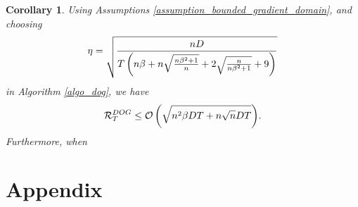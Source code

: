 \documentclass{article}
\newtheorem{Corollary}{\bf{Corollary}}
\begin{document}
\begin{Corollary}
Using Assumptions \ref{assumption_bounded_gradient_domain}, and choosing 
\begin{align}
\nonumber
\eta = \sqrt{\frac{nD}{T\left( n\beta + n\sqrt{\frac{n\beta^2+1}{n}} + 2\sqrt{\frac{n}{n\beta^2+1}} + 9  \right)}}
\end{align} in Algorithm \ref{algo_dog}, we have
\begin{align}
\nonumber
{\mathcal{R}}_T^{DOG} \le {\mathcal{O}\left( \sqrt{ n^2\beta DT + n\sqrt{n}DT} \right)}.
\end{align} Furthermore, when 




\end{Corollary}








\section*{Appendix}
\end{document}
